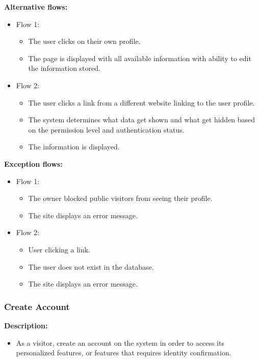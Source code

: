\documentclass[a4paper]{article}
\begin{document}
        \textbf{Alternative flows:}
        \begin{itemize}
            \item Flow 1:
            \begin{itemize}
                \item The user clicks on their own profile.
                \item The page is displayed with all available information with ability to edit the information stored.
            \end{itemize}
            \item Flow 2:
            \begin{itemize}
                \item The user clicks a link from a different website linking to the user profile.
                \item The system determines what data get shown and what get hidden based on the permission level and authentication status.
                \item The information is displayed.
            \end{itemize}
        \end{itemize}

        \textbf{Exception flows:}
        \begin{itemize}
            \item Flow 1:
            \begin{itemize}
                \item The owner blocked public visitors from seeing their profile.
                \item The site displays an error message.
            \end{itemize}
            \item Flow 2:
            \begin{itemize}
                \item User clicking a link.
                \item The user does not exist in the database.
                \item The site displays an error message.
            \end{itemize}
        \end{itemize}

        \subsubsection{Create Account}
        \textbf{Description:}
        \begin{itemize}
            \item As a visitor, create an account on the system in order to access its personalized features, or features that requires identity confirmation.
        \end{itemize}
\end{document}
